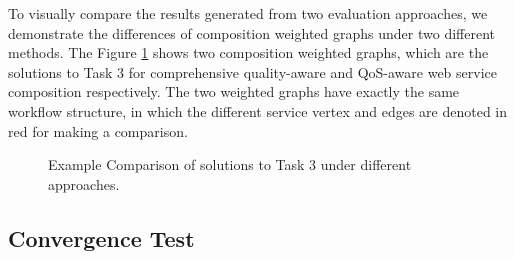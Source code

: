 \documentclass{llncs}
\begin{document}
To visually compare the results generated from two evaluation approaches, we demonstrate the differences of composition weighted graphs under two different methods. The Figure \ref{comparison} shows two composition weighted graphs, which are the solutions to Task 3 for comprehensive quality-aware and QoS-aware web service composition respectively. The two weighted graphs have exactly the same workflow structure, in which the different service vertex and edges are denoted in red for making a comparison.



\begin{figure}[h]
\centerline{
}
 \caption{Example Comparison of solutions to Task 3 under different approaches.}
 \label{comparison}
\end{figure}



\subsection{Convergence Test}\label{convergenceTest}
\end{document}
